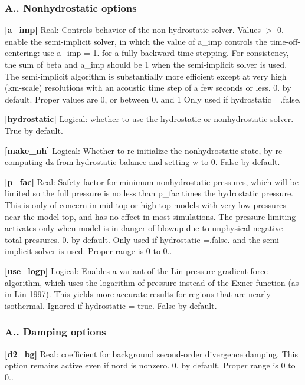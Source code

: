 \subsubsection*{A.. Nonhydrostatic options}

{\bfseries \mbox{[}a\+\_\+imp\mbox{]}} Real\+: Controls behavior of the non-\/hydrostatic solver. Values $>$ 0. enable the semi-\/implicit solver, in which the value of a\+\_\+imp controls the time-\/off-\/centering\+: use a\+\_\+imp = 1. for a fully backward time-\/stepping. For consistency, the sum of beta and a\+\_\+imp should be 1 when the semi-\/implicit solver is used. The semi-\/implicit algorithm is substantially more efficient except at very high (km-\/scale) resolutions with an acoustic time step of a few seconds or less. 0. by default. Proper values are 0, or between 0. and 1 Only used if hydrostatic =.false.

{\bfseries \mbox{[}hydrostatic\mbox{]}} Logical\+: whether to use the hydrostatic or nonhydrostatic solver. True by default.

{\bfseries \mbox{[}make\+\_\+nh\mbox{]}} Logical\+: Whether to re-\/initialize the nonhydrostatic state, by re-\/computing dz from hydrostatic balance and setting w to 0. False by default.

{\bfseries \mbox{[}p\+\_\+fac\mbox{]}} Real\+: Safety factor for minimum nonhydrostatic pressures, which will be limited so the full pressure is no less than p\+\_\+fac times the hydrostatic pressure. This is only of concern in mid-\/top or high-\/top models with very low pressures near the model top, and has no effect in most simulations. The pressure limiting activates only when model is in danger of blowup due to unphysical negative total pressures. 0. by default. Only used if hydrostatic =.false. and the semi-\/implicit solver is used. Proper range is 0 to 0..

{\bfseries \mbox{[}use\+\_\+logp\mbox{]}} Logical\+: Enables a variant of the Lin pressure-\/gradient force algorithm, which uses the logarithm of pressure instead of the Exner function (as in Lin 1997). This yields more accurate results for regions that are nearly isothermal. Ignored if hydrostatic = true. False by default.

\subsubsection*{A.. Damping options}

{\bfseries \mbox{[}d2\+\_\+bg\mbox{]}} Real\+: coefficient for background second-\/order divergence damping. This option remains active even if nord is nonzero. 0. by default. Proper range is 0 to 0..

